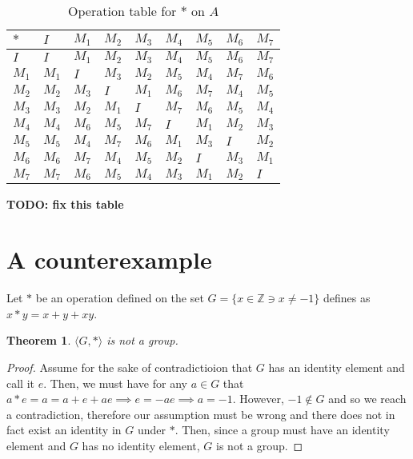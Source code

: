 \documentclass[12pt]{article}
\newcommand{\ints}{\mathbb{Z}}
\newtheorem{thm}{Theorem}
\begin{document}
\begin{table}[!ht] 
\begin{tabular}{l|llllllll}
	$*$ & $I$ & $M_1$ & $M_2$ & $M_3$ & $M_4$ & $M_5$ & $M_6$ & $M_7$  \\ \hline
	$I$ & $I$ & $M_1$ & $M_2$ & $M_3$ & $M_4$ & $M_5$ & $M_6$ & $M_7$  \\
	$M_1$ & $M_1$ & $I$ & $M_3$ & $M_2$ & $M_5$ & $M_4$ & $M_7$ & $M_6$  \\
	$M_2$ & $M_2$ & $M_3$ & $I$ & $M_1$ & $M_6$ & $M_7$ & $M_4$ & $M_5$  \\
	$M_3$ & $M_3$ & $M_2$ & $M_1$ & $I$ & $M_7$ & $M_6$ & $M_5$ & $M_4$  \\
	$M_4$ & $M_4$ & $M_6$ & $M_5$ & $M_7$ & $I$ & $M_1$ & $M_2$ & $M_3$  \\
	$M_5$ & $M_5$ & $M_4$ & $M_7$ & $M_6$ & $M_1$ & $M_3$ & $I$ & $M_2$  \\
	$M_6$ & $M_6$ & $M_7$ & $M_4$ & $M_5$ & $M_2$ & $I$ & $M_3$ & $M_1$  \\
	$M_7$ & $M_7$ & $M_6$ & $M_5$ & $M_4$ & $M_3$ & $M_1$ & $M_2$ & $I$  \\
\end{tabular}
\centering
\caption{Operation table for $*$ on $A$}
\label{t2}
\end{table}

\textbf{TODO: fix this table}

\section{A counterexample}

Let $*$ be an operation defined on the set $G = \{ x \in \ints \ni x \neq -1 \}$ defines as $x * y = x + y + xy$.

\begin{thm} \label{thm:6}
	$\langle G, * \rangle$ is not a group.
\end{thm}

\begin{proof}
	Assume for the sake of contradictioion that $G$ has an identity element and call it $e$.
	Then, we must have for any $a \in G$ that $a * e = a = a + e + ae \implies e = -ae \implies a = -1$.
	However, $-1 \not\in G$ and so we reach a contradiction,
	therefore our assumption must be wrong and there does not in fact exist an identity in $G$ under $*$.
	Then, since a group must have an identity element and $G$ has no identity element, $G$ is not a group.
\end{proof}
\end{document}
